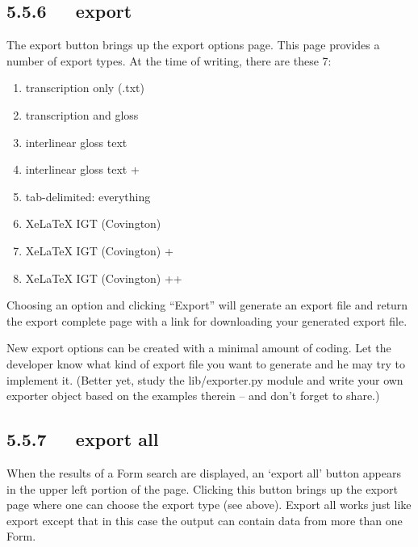 \documentclass[letterpaper,10pt,english]{sphinxmanual}
\begin{document}
\subsection{5.5.6   export}
\label{documentation:export}
The export button brings up the export options page.  This page provides a
number of export types.  At the time of writing, there are these 7:
\begin{enumerate}
\item {} 
transcription only (.txt)

\item {} 
transcription and gloss

\item {} 
interlinear gloss text

\item {} 
interlinear gloss text +

\item {} 
tab-delimited: everything

\item {} 
XeLaTeX IGT (Covington)

\item {} 
XeLaTeX IGT (Covington) +

\item {} 
XeLaTeX IGT (Covington) ++

\end{enumerate}

Choosing an option and clicking ``Export'' will generate an export file and return
the export complete page with a link for downloading your generated export file.

New export options can be created with a minimal amount of coding.  Let the
developer know what kind of export file you want to generate and he may try to
implement it.  (Better yet, study the lib/exporter.py module and write your
own exporter object based on the examples therein -- and don't forget to share.)


\subsection{5.5.7   export all}
\label{documentation:export-all}
When the results of a Form search are displayed, an `export all' button appears
in the upper left portion of the page.  Clicking this button brings up the
export page where one can choose the export type (see above).  Export all works
just like export except that in this case the output can contain data from more
than one Form.
\end{document}
